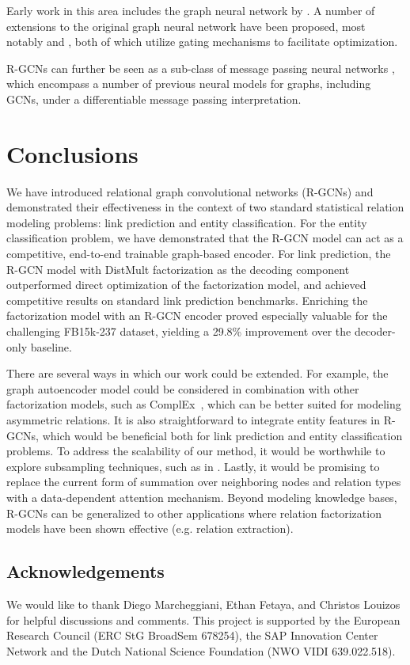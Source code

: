 Early work in this area includes the graph neural network by \citet{scarselli2009graph}. A number of extensions to the original graph neural network have been proposed, most notably \cite{li2015gated} and \cite{pham2016column}, both of which utilize gating mechanisms to facilitate optimization.

R-GCNs can further be seen as a sub-class of message passing neural networks \cite{gilmer2017neural}, which encompass a number of previous neural models for graphs, including GCNs, under a differentiable message passing interpretation.

\section{Conclusions}

We have introduced relational graph convolutional networks (R-GCNs) and demonstrated their effectiveness in the context of two standard statistical relation modeling problems: link prediction and entity classification. For the entity classification problem, we have demonstrated that the R-GCN model can act as a competitive, end-to-end trainable graph-based encoder. For link prediction, the R-GCN model with DistMult factorization as the decoding component outperformed direct optimization of the factorization model, and achieved competitive results on standard link prediction benchmarks. Enriching the factorization model with an R-GCN encoder proved especially valuable for the challenging FB15k-237 dataset, yielding a 29.8\% improvement over the decoder-only baseline.

There are several ways in which our work could be extended. For example, the graph autoencoder model could be considered in combination with other factorization models, such as ComplEx~\cite{complex-complex_embeddings_for_simple_link_prediction}, which can be better suited for modeling asymmetric relations. It is also straightforward to integrate entity features in R-GCNs, which would be beneficial both for link prediction and entity classification problems. To address the scalability of our method, it would be worthwhile to explore subsampling techniques, such as in \citet{hamilton2017inductive}. Lastly, it would be promising to replace the current form of summation over neighboring nodes and relation types with a data-dependent attention mechanism. Beyond modeling knowledge bases, R-GCNs can be generalized to other applications where relation factorization models have been shown effective (e.g. relation extraction). 

\subsection*{Acknowledgements}
We would like to thank Diego Marcheggiani, Ethan Fetaya, and Christos Louizos for helpful discussions and comments.
This project is supported by the European Research Council (ERC StG BroadSem 678254), the SAP Innovation
Center Network
and the Dutch National Science Foundation (NWO VIDI 639.022.518).

\newpage
\onecolumn
\setlength{\parskip}{0.5em}

